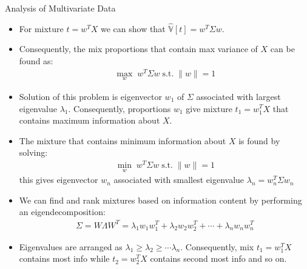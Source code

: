 \documentclass[9pt]{beamer}
\begin{document}
\begin{frame}{Analysis of Multivariate Data}

\begin{itemize}
\item For mixture $t=w^TX$ we can show that $\hat{\mathbb{V}}[t]=w^T\Sigma w$. 
\item Consequently, the mix proportions that contain max variance of $X$ can be found as:
\begin{align*}
\max_{w}\; w^T\Sigma w\; \textrm{s.t.}\; \|w\|=1
\end{align*}
\item Solution of this problem is eigenvector $w_1$ of $\Sigma$ associated with largest eigenvalue $\lambda_1$. Consequently, proportions $w_1$ give mixture  $t_1=w_1^TX$ that contains maximum information about $X$. 
\item The mixture that contains minimum information about $X$ is found by solving:
\begin{align*}
\min_{w}\; w^T\Sigma w\; \textrm{s.t.}\; \|w\|=1
\end{align*}
this gives eigenvector $w_n$ associated with smallest eigenvalue $\lambda_n=w^T_n\Sigma w_n$

\item We can find and rank mixtures based on information content by performing an eigendecomposition: 
\begin{align*}
\Sigma = W\Lambda W^T=\lambda_1w_1w_1^T+\lambda_2w_2w_2^T+\cdots + \lambda_n w_nw_n^T
\end{align*}
\item Eigenvalues are arranged as $\lambda_1\geq \lambda_2\geq \cdots \lambda _n$. Consequently, mix $t_1=w_1^TX$ contains most info while $t_2=w_2^TX$ contains second most info and so on. 


\end{itemize}


\end{frame}

\end{document}
